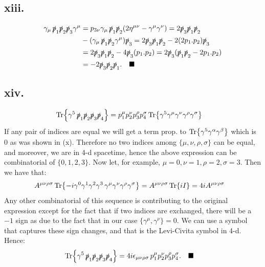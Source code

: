 \documentclass{article}
\newcommand{\slashp}{\slashed{p}}
\begin{document}
\subsection*{xiii.}
\begin{equation}
    \begin{split}
        \gamma_\mu\,\slashp_1\slashp_2\slashp_3 \gamma^\mu &=p_{3\nu}\gamma_\mu \, \slashp_1\slashp_2 (2\eta^{\mu\nu}-\gamma^\mu\gamma^\nu)=2\slashp_3\slashp_1\slashp_2\\
        &- (\gamma_\mu\,\slashp_1\slashp_2 \gamma^\mu)\slashp_3=2\slashp_3\slashp_1\slashp_2-2(2p_1.p_2)\slashp_3\\
        & = 2\slashp_3\slashp_1\slashp_2-4\slashp_3 (p_1.p_2)=2\slashp_3(\slashp_1\slashp_2-2p_1.p_2)\\
        &= -2\slashp_3\slashp_2\slashp_1. \quad \blacksquare
    \end{split}
\end{equation}

\subsection*{xiv.}
\begin{equation}
    \begin{split}
        \Tr{\gamma^5\, \slashp_1\slashp_2\slashp_3\slashp_4}&=p_1^\mu p_2^\nu p_3^\rho p_4^\sigma \Tr{\gamma^5 \gamma^\mu \gamma^\nu \gamma^\rho \gamma^\sigma}
    \end{split}
\end{equation}
If any pair of indices are equal we will get a term prop. to $\Tr{\gamma^5\gamma^\alpha\gamma^\beta}$ which is $0$ as was shown in (x). Therefore no two indices among $\{\mu,\nu,\rho,\sigma\}$ can be equal, and moreover, we are in 4-d spacetime, hence the above expression can be combinatorial of $\{0,1,2,3\}$. Now let, for example, $\mu=0,\nu=1,\rho=2,\sigma=3$. Then we have that:
\begin{equation}
    \begin{split}
        A^{\mu\nu\rho\sigma}\Tr{-i\gamma^0\gamma^1\gamma^2\gamma^3\, \gamma^\mu \gamma^\nu \gamma^\rho \gamma^\sigma}&=A^{\mu\nu\rho\sigma} \Tr{i I }=4iA^{\mu\nu\rho\sigma}
    \end{split}
\end{equation}
Any other combinatorial of this sequence is contributing to the original expression except for the fact that if two indices are  exchanged, there will be a $-1$ sign as due to the fact that in our case $\{\gamma^\mu, \gamma^\nu\}=0.$ We can use a symbol that captures these sign changes, and that is the Levi-Civita symbol in 4-d. Hence:
\begin{equation}
    \begin{split}
        \Tr{\gamma^5\, \slashp_1\slashp_2\slashp_3\slashp_4}&=4i\epsilon_{\mu\nu\rho\sigma}\,p_1^\mu p_2^\nu p_3^\rho p_4^\sigma. \quad \blacksquare
    \end{split}
\end{equation}
\end{document}
